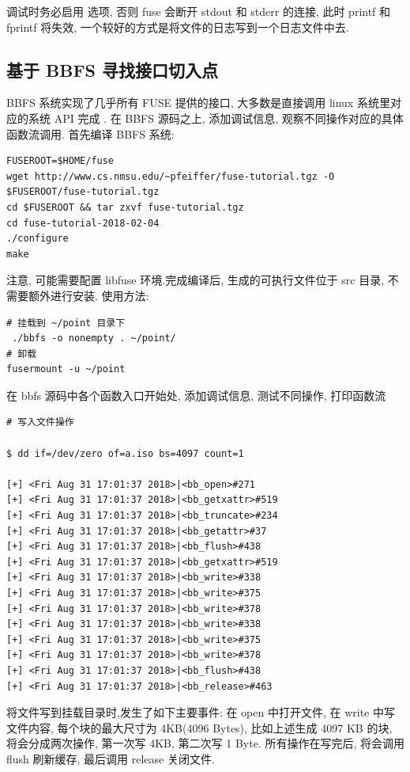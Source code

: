 调试时务必启用  选项, 否则 fuse 会断开 stdout 和 stderr 的连接,
此时 printf 和 fprintf 将失效, 一个较好的方式是将文件的日志写到一个日志文件中去.

\subsection{基于 BBFS 寻找接口切入点}
\label{sec:rlfsentry}

BBFS 系统实现了几乎所有 FUSE 提供的接口, 大多数是直接调用 linux 系统里对应的系统 API 完成
. 在 BBFS 源码之上, 添加调试信息, 观察不同操作对应的具体函数流调用. 首先编译 BBFS 系统:

\begin{lstlisting}[style=verb]
FUSEROOT=$HOME/fuse
wget http://www.cs.nmsu.edu/~pfeiffer/fuse-tutorial.tgz -O $FUSEROOT/fuse-tutorial.tgz
cd $FUSEROOT && tar zxvf fuse-tutorial.tgz
cd fuse-tutorial-2018-02-04
./configure
make
\end{lstlisting}

注意, 可能需要配置 libfuse 环境.完成编译后, 生成的可执行文件位于 src 目录, 不需要额外进行安装.
使用方法:

\begin{lstlisting}[style=verb]
# 挂载到 ~/point 目录下
 ./bbfs -o nonempty . ~/point/
# 卸载
fusermount -u ~/point
\end{lstlisting}

在 bbfs 源码中各个函数入口开始处, 添加调试信息, 测试不同操作, 打印函数流
\begin{lstlisting}[style=verb]
# 写入文件操作

$ dd if=/dev/zero of=a.iso bs=4097 count=1

[+] <Fri Aug 31 17:01:37 2018>|<bb_open>#271
[+] <Fri Aug 31 17:01:37 2018>|<bb_getxattr>#519
[+] <Fri Aug 31 17:01:37 2018>|<bb_truncate>#234
[+] <Fri Aug 31 17:01:37 2018>|<bb_getattr>#37
[+] <Fri Aug 31 17:01:37 2018>|<bb_flush>#438
[+] <Fri Aug 31 17:01:37 2018>|<bb_getxattr>#519
[+] <Fri Aug 31 17:01:37 2018>|<bb_write>#338
[+] <Fri Aug 31 17:01:37 2018>|<bb_write>#375
[+] <Fri Aug 31 17:01:37 2018>|<bb_write>#378
[+] <Fri Aug 31 17:01:37 2018>|<bb_write>#338
[+] <Fri Aug 31 17:01:37 2018>|<bb_write>#375
[+] <Fri Aug 31 17:01:37 2018>|<bb_write>#378
[+] <Fri Aug 31 17:01:37 2018>|<bb_flush>#438
[+] <Fri Aug 31 17:01:37 2018>|<bb_release>#463
\end{lstlisting}

将文件写到挂载目录时,发生了如下主要事件:
在 open 中打开文件, 在 write 中写文件内容,
每个块的最大尺寸为 4KB(4096 Bytes), 比如上述生成 4097 KB
的块, 将会分成两次操作, 第一次写 4KB, 第二次写 1 Byte.
所有操作在写完后, 将会调用 flush 刷新缓存, 最后调用 release 关闭文件.

